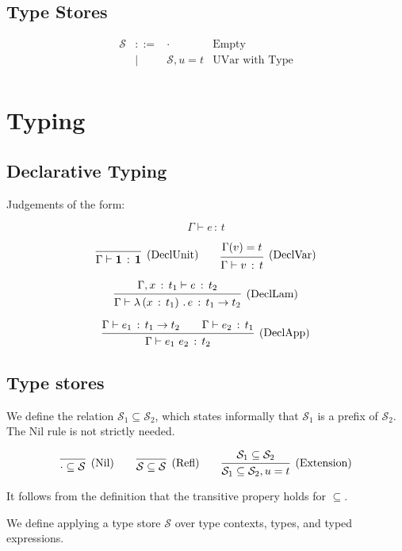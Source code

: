 \documentclass{article}
\newcommand{\define}{::=}
\newcommand{\G}{\Gamma}
\newcommand{\St}{\mathcal{S}}
\newcommand{\unit}{\mathbf{1}}
\newcommand{\tp}{t}
\newcommand{\uv}{u}
\newcommand{\e}{e}
\newcommand{\x}{x}
\newcommand{\var}{v}
\newcommand{\nil}{\cdot}
\newcommand{\spc}{\qquad}
\newcommand{\set}[2]{{#1} = {#2}}
\newcommand{\withtp}[2]{{#1} \,:\, {#2}}
\newcommand{\app}[2]{{#1}\ {#2}}
\newcommand{\lamtp}[3]{\lambda \left( {\withtp {#1} {#2}} \right) \,.\, {#3}}
\newcommand{\arr}[2]{{#1} \to {#2}}
\newcommand{\hastp}[3]{#1 \vdash {\withtp {#2} {#3}}}
\newcommand{\deduct}[3][]
{
  \begin{prooftree}
    \hypo{#2}
    \infer1[\text{#1}]{#3}
  \end{prooftree}
}
\begin{document}
\subsection{Type Stores}
\[
  \begin{array}{rcll}
    \St  & \define & \nil & \text{Empty} \\
         & \mid    & \St , {\set \uv \tp} & \text{UVar with Type}  \\
  \end{array}
\]

\section{Typing}

\subsection{Declarative Typing}

Judgements of the form:

\[ \hastp \G \e \tp \]

\[
\deduct
  {}
  {\hastp \G \unit \unit}
  {\text{(DeclUnit)}}
\spc
\deduct
  {\G(\var) = \tp}
  {\hastp \G \var \tp}
  {\text{(DeclVar)}}
\]

\[
  \deduct
  {\hastp {\G, {\withtp \x {\tp_1}}} \e {\tp_2}}
  {\hastp \G {\lamtp {\x} {\tp_1} {\e}} {\arr {\tp_1} {\tp_2}}}
  {\text{(DeclLam)}}
\]

\[
  \deduct
  {\hastp \G {\e_1} {\arr {\tp_1} {\tp_2}} \spc 
   \hastp \G {\e_2} {\tp_1}}
  {\hastp \G {\app {\e_1} {\e_2}} {\tp_2}}
  {\text{(DeclApp)}}
\]

\subsection{Type stores}

We define the relation \(\St_1 \subseteq \St_2\), which states informally that
\(\St_1\) is a prefix of \(\St_2\). The Nil rule is not strictly needed.

\[
  \deduct
  {}
  {\nil \subseteq \St}
  {\text{(Nil)}}
  \spc
  \deduct
  {}
  {\St \subseteq \St}
  {\text{(Refl)}}
  \spc
  \deduct
  {\St_1 \subseteq \St_2}
  {\St_1 \subseteq \St_2, \uv = \tp}
  {\text{(Extension)}}
\]

It follows from the definition that the transitive propery holds for
\(\subseteq\).

We define applying a type store \(\St\) over type contexts, types,
and typed expressions.
\end{document}
